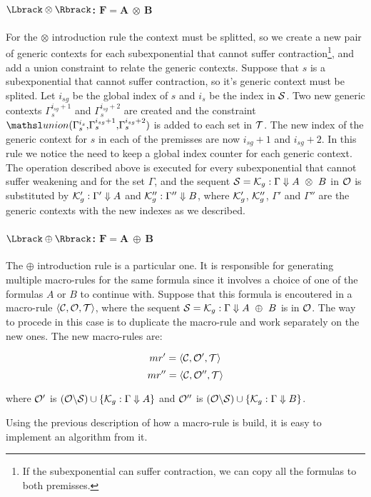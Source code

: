 
\paragraph{$\alg{\otimes}$: $\mathbf{F = A\ \otimes\ B}$\\}
For the $\otimes$ introduction rule the context must be splitted, so we create a
new pair of generic contexts for each subexponential that cannot suffer
contraction\footnote{If the subexponential can suffer contraction, we can copy
all the formulas to both premisses.}, and add a union constraint to relate the
generic contexts. Suppose that $s$ is a subexponential that cannot suffer
contraction, so it's generic context must be splited. Let $i_{sg}$ be the global
index of $s$ and $i_s$ be the index in $\mathcal{S}$. 
Two new generic contexts $\Gamma_s^{i_{sg} + 1}$ and $\Gamma_s^{i_{sg} +
2}$ are created and the constraint $\union{\Gamma_s^{i_s}}{\Gamma_s^{i_{sg} +
1}}{\Gamma_s^{i_{sg} + 2}}$ is added to each set in $\mathcal{T}$. The new index of
the generic context for $s$ in each of the premisses are now $i_{sg} + 1$ and
$i_{sg} + 2$. In this rule we notice the need to keep a global index counter for
each generic context. The operation described above is executed for every
subexponential that cannot suffer weakening and for the set $\Gamma$, and the sequent $\mathcal{S} =
\mathcal{K}_{g} : \Gamma \Downarrow A\ \otimes\ B$ in $\mathcal{O}$ is substituted by
$\mathcal{K}_{g}' : \Gamma' \Downarrow A$ and $\mathcal{K}_{g}'' : \Gamma'' \Downarrow
B$, where $\mathcal{K}_{g}'$, $\mathcal{K}_{g}''$, $\Gamma'$ and $\Gamma''$ are the
generic contexts with the new indexes as we described.

\paragraph{$\alg{\oplus}$: $\mathbf{F = A\ \oplus\ B}$\\}
The $\oplus$ introduction rule is a particular one. It is responsible for
generating multiple macro-rules for the same formula since it involves a choice
of one of the formulas $A$ or $B$ to continue with. Suppose that this formula is
encoutered in a macro-rule $\langle \mathcal{C}, \mathcal{O}, \mathcal{T} \rangle$, where the
sequent $\mathcal{S} = \mathcal{K}_{g} : \Gamma \Downarrow A\ \oplus\ B$ is in $\mathcal{O}$.
The way to procede in this case is to duplicate the macro-rule and work
separately on the new ones. The new macro-rules are:

$$mr' = \langle \mathcal{C}, \mathcal{O}', \mathcal{T} \rangle$$
$$mr'' = \langle \mathcal{C}, \mathcal{O}'', \mathcal{T} \rangle$$

where $\mathcal{O}'$ is $(\mathcal{O} \backslash \mathcal{S}) \cup \{ \mathcal{K}_{g} : \Gamma
\Downarrow A \}$ and $\mathcal{O}''$ is $(\mathcal{O} \backslash \mathcal{S}) \cup \{ \mathcal{K}_{g} : \Gamma
\Downarrow B \}$. 

\vspace{0.5cm}

Using the previous description of how a macro-rule is build, it is easy to
implement an algorithm from it.


